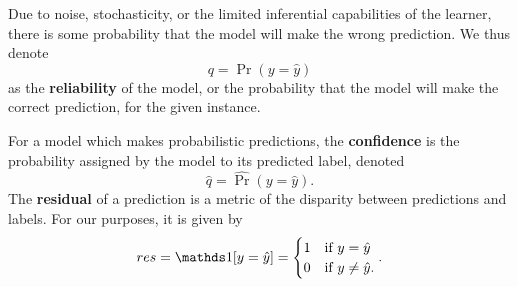 Due to noise, stochasticity, or the limited inferential capabilities of the learner, there is some probability that the model will make the wrong prediction. We thus denote
\begin{equation}
q = \Pr(y=\hat{y})
\end{equation}
as the {\bf reliability} of the model, or the probability that the model will make the correct prediction, for the given instance. 

For a model which makes probabilistic predictions, the {\bf confidence} is the probability assigned by the model to its predicted label, denoted
\begin{equation}
\hat{q} = \hat{\Pr}(y=\hat{y}).
\end{equation}
The {\bf residual} of a prediction is a metric of the disparity between predictions and labels. For our purposes, it is given by
\begin{equation}
    res = \id{y=\hat{y}} = \begin{cases} 1 & \text{if }y=\hat{y} \\ 0 & \text{if }y\ne\hat{y}.
    \end{cases}.
\end{equation}


